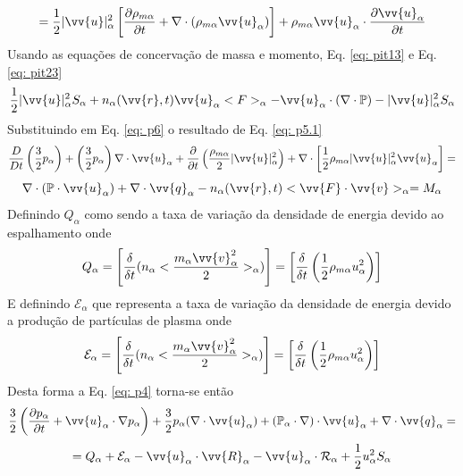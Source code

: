 \documentclass[12pt,oneside,a4paper]{abntex2}
\begin{document}
\begin{equation*}
= \frac{1}{2}|\vv{u}|^2_\alpha \left[  \frac{\partial \rho_{m\alpha} }{\partial t} +  \nabla \cdot (\rho_{m\alpha} \vv{u}_\alpha)   \right] + \rho_{m\alpha}  \vv{u}_\alpha \cdot \frac{\partial \vv{u}_\alpha}{\partial t}
\end{equation*}
 Usando as equações de concervação de massa e momento, Eq. \ref{eq: pit13} e Eq. \ref{eq: pit23} 
\begin{equation}
\label{eq: p6}
 \frac{1}{2}|\vv{u}|^2_\alpha S_\alpha + n_\alpha(\vv{r},t)\vv{u}_\alpha<F>_\alpha-\vv{u}_\alpha \cdot (\nabla \cdot \mathbb{P})-|\vv{u}|^2_\alpha S_\alpha
 \end{equation} 
 Substituindo em Eq.  \ref{eq: p6} o resultado de Eq. \ref{eq: p5.1}
 \begin{equation}
\label{eq: p5}
\frac{D}{Dt} \left( \frac{3}{2}p_\alpha \right) + \left(\frac{3}{2}p_\alpha \right)  \nabla \cdot \vv{u}_\alpha +  \frac{\partial }{\partial t} \left(\frac{\rho_{m\alpha}}{2} |\vv{u}|^2_\alpha \right) +\nabla \cdot \left[ \frac{1}{2}\rho_{m\alpha}|\vv{u}|^2_\alpha \vv{u}_\alpha \right]  = 
\end{equation}
\begin{equation*}
\nabla \cdot (\mathbb{P} \cdot \vv{u}_\alpha) + \nabla \cdot \vv{q}_\alpha-n_\alpha(\vv{r},t) <\vv{F} \cdot \vv{v}>_\alpha = M_\alpha
\end{equation*}
Definindo  $Q_\alpha$ como sendo a taxa de variação da densidade de energia devido ao espalhamento onde
\begin{equation}
Q_\alpha = \left[ \frac{\delta}{\delta t}(n_\alpha<\frac{m_\alpha \vv{v}^2_\alpha}{2}>_\alpha) \right] = \left[ \frac{\delta}{\delta t}\left( \frac{1}{2} \rho_{m\alpha} u^2_\alpha \right) \right]
\end{equation}
E definindo $\mathcal{E}_\alpha$ que representa a taxa de variação da densidade de energia devido a produção de partículas de plasma onde 
\begin{equation}
\mathcal{E}_\alpha = \left[ \frac{\delta}{\delta t}(n_\alpha<\frac{m_\alpha \vv{v}^2_\alpha}{2}>_\alpha) \right] = \left[ \frac{\delta}{\delta t}\left( \frac{1}{2} \rho_{m\alpha} u^2_\alpha \right) \right]
\end{equation}
Desta forma a Eq. \ref{eq: p4} torna-se então
\begin{equation}
\label{concenergia}
\frac{3}{2} \left( \frac{\partial p_\alpha}{\partial t} + \vv{u}_\alpha \cdot \nabla p_\alpha\right)+ \frac{3}{2} p_\alpha (\nabla \cdot \vv{u}_\alpha)+(\mathbb{P}_\alpha \cdot \nabla)\cdot \vv{u}_\alpha + \nabla \cdot \vv{q}_\alpha =  
\end{equation}
\begin{equation*}
= Q_\alpha + \mathcal{E}_\alpha-\vv{u}_\alpha \cdot \vv{R}_\alpha - \vv{u}_\alpha \cdot \mathcal{R}_\alpha+\frac{1}{2}u^2_\alpha S_\alpha
\end{equation*}
\end{document}
